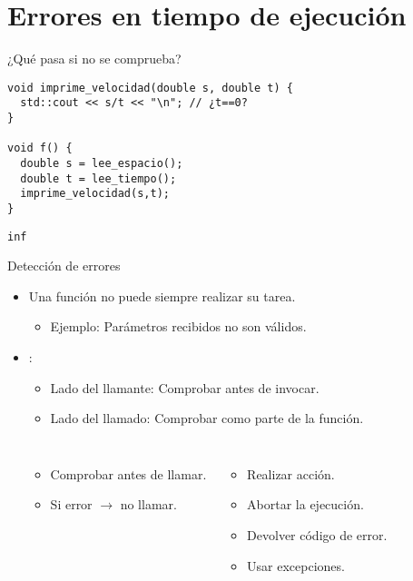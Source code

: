 \section{Errores en tiempo de ejecución}

\begin{frame}[fragile]{¿Qué pasa si no se comprueba?}
\begin{lstlisting}
void imprime_velocidad(double s, double t) {
  std::cout << s/t << "\n"; // ¿t==0?
}

void f() {
  double s = lee_espacio();
  double t = lee_tiempo();
  imprime_velocidad(s,t);
}
\end{lstlisting}
\begin{lstlisting}[style=terminal]
inf
\end{lstlisting}
\end{frame}

\begin{frame}[t]{Detección de errores}
\begin{itemize}
  \item Una función no puede siempre realizar su tarea.
    \begin{itemize}
      \item Ejemplo: Parámetros recibidos no son válidos.
    \end{itemize}

  \item {}:
    \begin{itemize}
      \item Lado del llamante: Comprobar antes de invocar.
      \item Lado del llamado: Comprobar como parte de la función.
    \end{itemize}

  \begin{columns}[T]
  
  \begin{itemize}
    \item Comprobar antes de llamar.
    \item Si error $\rightarrow$ no llamar.
  \end{itemize}

  \begin{itemize}
    \item Realizar acción.
    \item Abortar la ejecución.
    \item Devolver código de error.
    \item Usar excepciones.
  \end{itemize}
  \end{columns}

\end{itemize}
\end{frame}

